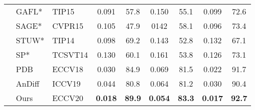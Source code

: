 \documentclass[runningheads]{llncs}
\begin{document}
\begin{table*}[t!]
{\begin{tabular}{c|l|l|cc|cc|cc}
			&GAFL* \cite{video_gafl}  &TIP15  &0.091 &57.8 &0.150 &55.1 & 0.099 &72.6 \\
			&SAGE* \cite{video_sage} &CVPR15   &0.105  &47.9 &0142 &58.1  &0.096 &73.4  \\
			&STUW* \cite{video_stuw} &TIP14 &0.098& 69.2 &0.143 &52.8 &0.132 &67.1\\
			&SP*  \cite{video_sp}  &TCSVT14  &0.130  & 60.1  &0.161  &53.8  &0.126  &73.1  \\
			&PDB  \cite{vos_pdb} &ECCV18    &0.030 &84.9   &0.069 &81.5 &0.022 &91.7 \\
			&AnDiff \cite{vos_andiff}&ICCV19  & 0.044 &80.8 &0.064 & 81.2 & 0.030 & 90.4 \\
			\hline
			& Ours &ECCV20  & \textbf{0.018} & \textbf{89.9} & \textbf{0.054} &\textbf{ 83.3} & \textbf{0.017} &\textbf{92.7}\\ 				
			
			\bottomrule
		\end{tabular}
	}	
	
	\label{visal_sota}
\end{table*}
\end{document}
